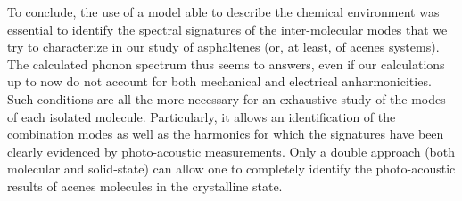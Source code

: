  To conclude, the use of a model able to describe the chemical environment was essential to identify the spectral signatures of the inter-molecular modes that we try to characterize in our study of asphaltenes (or, at least, of acenes systems). The calculated phonon spectrum thus seems to answers, even if our calculations up to now do not account for both mechanical and electrical anharmonicities. Such conditions are all the more necessary for an exhaustive study of the modes of each isolated molecule. Particularly, it allows an identification of the combination modes as well as the harmonics for which the signatures have been clearly evidenced by photo-acoustic measurements. Only a double approach (both molecular and solid-state) can allow one to completely identify the photo-acoustic results of acenes molecules in the crystalline state.
 
